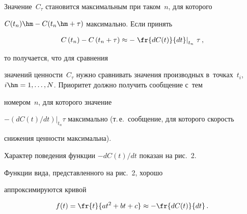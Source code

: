   


  Значение~$C_\tau$ становится максимальным при таком~$n$, для которого 


$C(t_n)\hm- C(t_n\hm+\tau)$ максимально. Если принять 


$$


C\left(t_n\right)- C\left(t_n+\tau\right)\approx -\left.\fr{dC(t)}{dt}\right\vert_{t_n}\,\tau\,,


$$


 то получается, что для сравнения 


значений цен\-ности~$C_\tau$ нужно сравнивать значения производных в~точках~$t_i$, $i\hm=1,\ldots , N$. Приоритет должно получить сообщение с~тем 


номером~$n$, для которого значение  


$-(dC(t)/dt)\vert_{t_n}\tau$ максимально (т.\,е.\ сообщение, для которого скорость 


снижения цен\-ности максимальна). 








  


  Характер поведения функции $-dC(t)/dt$ показан на рис.~2.


  


  Функции вида, представленного на рис.~2, хорошо 


аппроксимируются кривой 


  $$


  f(t)=\fr{t}{at^2+bt+c}\approx -\fr{dC(t)}{dt}\,.


  $$ 


  


  \pagebreak


  


  \


  


  \vspace*{-12pt}


  


